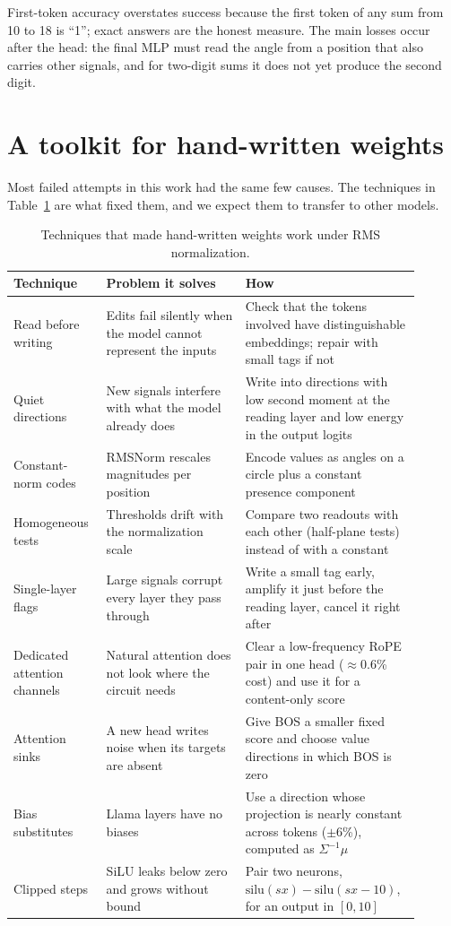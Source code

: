 \documentclass[11pt]{article}
\begin{document}
First-token accuracy overstates success because the first token of any sum from 10 to 18 is ``1''; exact answers are the honest measure. The main losses occur after the head: the final MLP must read the angle from a position that also carries other signals, and for two-digit sums it does not yet produce the second digit.

\section{A toolkit for hand-written weights}\label{sec:toolkit}
Most failed attempts in this work had the same few causes. The techniques in Table~\ref{tab:toolkit} are what fixed them, and we expect them to transfer to other models.

\begin{table}[h]
\centering
\small
\begin{tabular}{p{0.19\linewidth}p{0.32\linewidth}p{0.39\linewidth}}
\toprule
Technique & Problem it solves & How \\
\midrule
Read before writing & Edits fail silently when the model cannot represent the inputs & Check that the tokens involved have distinguishable embeddings; repair with small tags if not \\
Quiet directions & New signals interfere with what the model already does & Write into directions with low second moment at the reading layer and low energy in the output logits \\
Constant-norm codes & RMSNorm rescales magnitudes per position & Encode values as angles on a circle plus a constant presence component \\
Homogeneous tests & Thresholds drift with the normalization scale & Compare two readouts with each other (half-plane tests) instead of with a constant \\
Single-layer flags & Large signals corrupt every layer they pass through & Write a small tag early, amplify it just before the reading layer, cancel it right after \\
Dedicated attention channels & Natural attention does not look where the circuit needs & Clear a low-frequency RoPE pair in one head ($\approx$0.6\% cost) and use it for a content-only score \\
Attention sinks & A new head writes noise when its targets are absent & Give BOS a smaller fixed score and choose value directions in which BOS is zero \\
Bias substitutes & Llama layers have no biases & Use a direction whose projection is nearly constant across tokens ($\pm$6\%), computed as $\Sigma^{-1}\mu$ \\
Clipped steps & SiLU leaks below zero and grows without bound & Pair two neurons, $\mathrm{silu}(sx)-\mathrm{silu}(sx-10)$, for an output in $[0,10]$ \\
\bottomrule
\end{tabular}
\caption{Techniques that made hand-written weights work under RMS normalization.}
\label{tab:toolkit}
\end{table}
\end{document}
